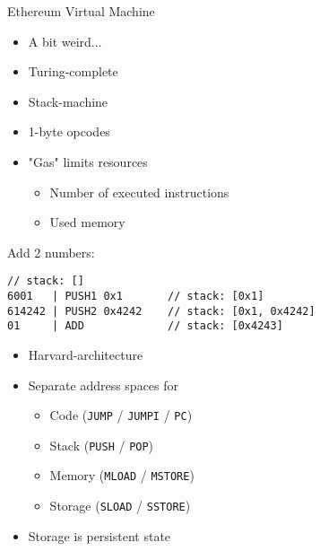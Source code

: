 \begin{frame}
  {Ethereum Virtual Machine}

  \begin{itemize}
    \item A bit weird...
  \end{itemize}

  \begin{itemize}
    \item Turing-complete
    \item Stack-machine
    \item 1-byte opcodes
    \item "Gas" limits resources
      \begin{itemize}
        \item Number of executed instructions
        \item Used memory
      \end{itemize}
  \end{itemize}

\framebreak

Add 2 numbers:

\begin{lstlisting}[frame=single]
                         // stack: []
6001   | PUSH1 0x1       // stack: [0x1]
614242 | PUSH2 0x4242    // stack: [0x1, 0x4242]
01     | ADD             // stack: [0x4243]
\end{lstlisting}

\framebreak

  \begin{itemize}
    \item Harvard-architecture
    \item Separate address spaces for
      \begin{itemize}
        \item Code (\texttt{JUMP} / \texttt{JUMPI} / \texttt{PC})
        \item Stack (\texttt{PUSH} / \texttt{POP})
        \item Memory (\texttt{MLOAD} / \texttt{MSTORE})
        \item Storage (\texttt{SLOAD} / \texttt{SSTORE})
      \end{itemize}
    \item Storage is persistent state
  \end{itemize}

\framebreak


\end{frame}
